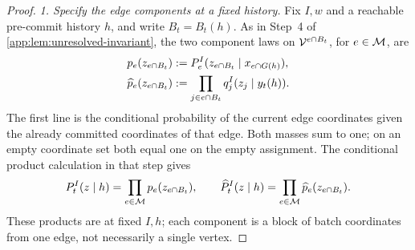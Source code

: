 \begin{proof}
\emph{1. Specify the edge components at a fixed history.}
Fix \(I,w\) and a reachable pre-commit history \(h\), and write
\(B_t=B_t(h)\). As in Step~4 of \cref{app:lem:unresolved-invariant}, the
two component laws on \(\Vocab^{e\cap B_t}\), for
\(e\in\HiddenMatching\), are
\begin{align*}
 p_e(z_{e\cap B_t})
 &:=\HardEdgeLaw{e}{I}
        (z_{e\cap B_t}\mid x_{e\cap G(h)}),\\
 \widehat p_e(z_{e\cap B_t})
 &:=\prod_{j\in e\cap B_t}
       \HardOracleRowMass{I}{y_t(h)}{j}{z_j}.
\end{align*}
The first line is the conditional probability of the current edge
coordinates given the already committed coordinates of that edge.
Both masses sum to one; on an empty coordinate set both equal one on the
empty assignment. The conditional product calculation in that step gives
\[
 \HardExactBatchLaw{t}{I}(z\mid h)
   =\prod_{e\in\HiddenMatching}p_e(z_{e\cap B_t}),
 \qquad
 \HardProductBatchLaw{t}{I}(z\mid h)
   =\prod_{e\in\HiddenMatching}\widehat p_e(z_{e\cap B_t}).
\]
These products are at fixed \(I,h\); each component is a block of batch
coordinates from one edge, not necessarily a single vertex.


\end{proof}
